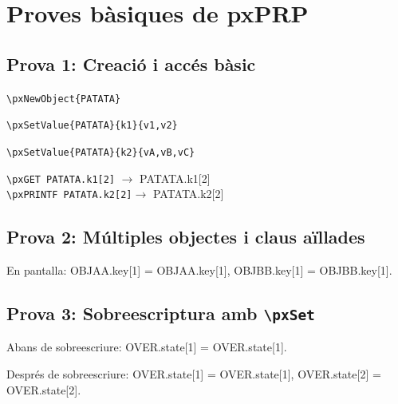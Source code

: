 \documentclass[fake,cover-config=offset,default]{P3CTeX}
\begin{document}
	\section{Proves bàsiques de pxPRP}



	\subsection{Prova 1: Creació i accés bàsic}
	\verb*|\pxNewObject{PATATA}|\\

	\verb*|\pxSetValue{PATATA}{k1}{v1,v2}|\\

	\verb*|\pxSetValue{PATATA}{k2}{vA,vB,vC}|\\

	\verb*|\pxGET PATATA.k1[2]| $\to$ \pxGET PATATA.k1[2]\\

	\verb*|\pxPRINTF PATATA.k2[2]|$\to$ \pxPRINTF PATATA.k2[2]

	\bigskip

	\subsection{Prova 2: Múltiples objectes i claus aïllades}



	En pantalla: OBJAA.key[1] = \pxGET OBJAA.key[1],\quad
	OBJBB.key[1] = \pxGET OBJBB.key[1].

	\bigskip

	\subsection{Prova 3: Sobreescriptura amb \texttt{\textbackslash pxSet}}


	Abans de sobreescriure: OVER.state[1] = \pxGET OVER.state[1].


	Després de sobreescriure: OVER.state[1] = \pxGET OVER.state[1],\quad
	OVER.state[2] = \pxGET OVER.state[2].
\end{document}
